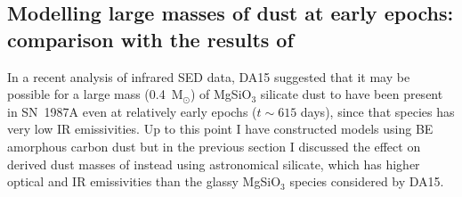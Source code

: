 \subsection{Modelling large masses of dust at early epochs: comparison 
with the results of \citet{Dwek2015}}
\label{dwek}

In a recent analysis of infrared SED data, DA15 suggested that it may be possible for a large mass (0.4~M$_\odot$) of 
MgSiO$_3$ silicate dust to have been present in SN~1987A even at 
relatively early epochs ($t\sim615$ days), since that species has very low 
IR emissivities.  Up to this point I have constructed models using 
\citet{Zubko1996} BE amorphous carbon dust but in the previous section I 
discussed the effect on derived dust masses of instead using 
\citet{Draine1984} astronomical silicate, which has higher optical and IR 
emissivities than the glassy MgSiO$_3$ species considered by DA15. 


